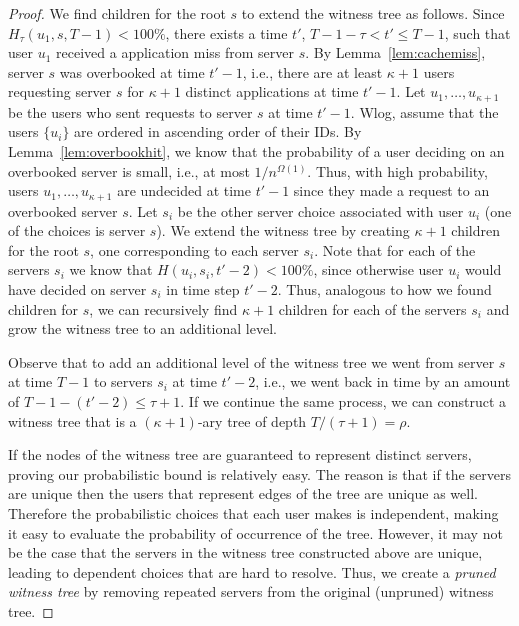 \documentclass[conference]{IEEEtran}
\begin{document}
\begin{proof}
We find children for the root $s$ to extend the witness tree as follows. Since $H_\tau(u_1, s, T-1) < 100\%$, there exists a time $t'$, $T  - 1 - \tau < t' \leq T -1$, such that user  $u_1$ received a application miss from server $s$.  By Lemma~\ref{lem:cachemiss},  server $s$ was overbooked at time $t' - 1$, i.e., there are at least $\kappa + 1$  users requesting server $s$ for $\kappa + 1$ distinct applications at time $t' - 1$. Let $u_1,\ldots,u_{\kappa+1}$ be the users who sent requests to server $s$ at time $t' - 1$. Wlog, assume that the users $\{u_i\}$ are ordered in 
ascending order of their IDs.  By Lemma~\ref{lem:overbookhit}, we know that the probability of a user deciding on an overbooked server is small, i.e., at most $1/n^{\Omega(1)}$. Thus, with high probability, users $u_1,\ldots,u_{\kappa+1}$  are undecided at time $t' - 1$ since they made a request to an overbooked server $s$. Let $s_i$ be the other server choice associated with user $u_i$ (one of the choices is server $s$).  We extend the witness tree by creating $\kappa +1$ children for the root $s$, one corresponding to each server $s_i$.  Note that for each of the servers $s_i$ we know that $H(u_i, s_i, t' -2) < 100\%$, since otherwise user $u_i$ would have decided on server $s_i$ in time step $t' -2$. Thus, analogous to how we found children for $s$, we can recursively find $\kappa + 1$ children for each of the servers $s_i$ and grow the witness tree to an additional level.   

Observe that to add an additional level of the witness tree we went from server $s$ at time $T -1$ to servers $s_i$ at time $t' -2$, i.e., we went back in time by an amount of $T - 1 - (t' - 2) \leq \tau + 1$. If we continue the same process, we can construct a witness tree that is a $(\kappa + 1)$-ary tree of depth $T/(\tau + 1) = \rho$. 


If the nodes of the witness tree are guaranteed to represent distinct servers, proving our probabilistic bound is relatively easy. The reason is that if the servers are unique then the users that represent edges of the tree are unique as well. Therefore the probabilistic choices that each user makes is independent, making it easy to evaluate the probability of occurrence of the tree. However, it may not be the case that the servers in the witness tree constructed above are unique, leading to dependent choices that are hard to resolve. Thus, we create a {\em pruned witness tree} by removing repeated servers from the  original (unpruned) witness tree. 


\end{proof}
\end{document}
